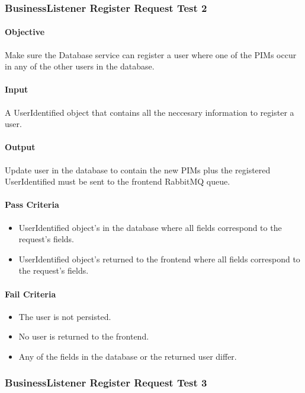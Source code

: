 \documentclass[hidelinks,english]{article}
\begin{document}
			\subsubsection{BusinessListener Register Request Test 2}\label{databasebusinesslistenerregistertest2}
				\paragraph{Objective} Make sure the Database service can register a user where one of the PIMs occur in any of the other users in the database.
				\paragraph{Input} A UserIdentified object that contains all the neccesary information to register a user.
				\paragraph{Output} Update user in the database to contain the new PIMs plus the registered UserIdentified must be sent to the frontend RabbitMQ queue.
				\paragraph{Pass Criteria}
				\begin{itemize}
					\item UserIdentified object's in the database where all fields correspond to the request's fields.
					\item UserIdentified object's returned to the frontend where all fields correspond to the request's fields.
				\end{itemize}
				\paragraph{Fail Criteria}
				\begin{itemize}
					\item The user is not persisted.
					\item No user is returned to the frontend.
					\item Any of the fields in the database or the returned user differ.
				\end{itemize}
				
			\subsubsection{BusinessListener Register Request Test 3}\label{databasebusinesslistenerregistertest3}
\end{document}
